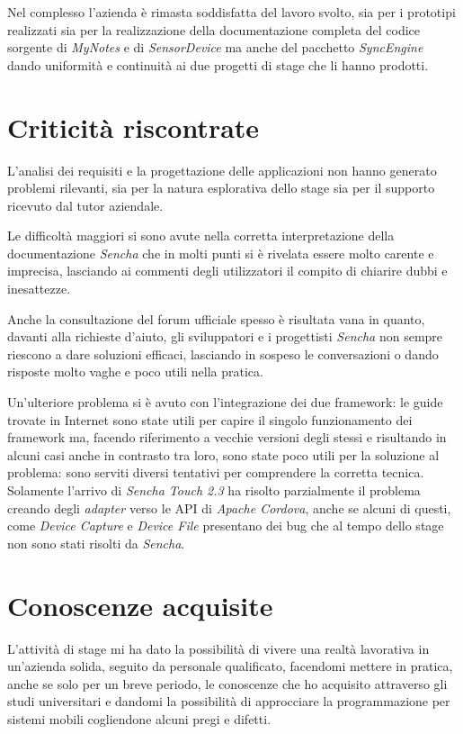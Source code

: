 Nel complesso l'azienda è rimasta soddisfatta del lavoro svolto, sia per i prototipi realizzati sia per la realizzazione della documentazione completa del codice sorgente di \emph{MyNotes} e di \emph{SensorDevice} ma anche del pacchetto \emph{SyncEngine} dando uniformità e continuità ai due progetti di stage che li hanno prodotti.

\section{Criticità riscontrate}
L'analisi dei requisiti e la progettazione delle applicazioni non hanno generato problemi rilevanti, sia per la natura esplorativa dello stage sia per il supporto ricevuto dal tutor aziendale.

Le difficoltà maggiori si sono avute nella corretta interpretazione della documentazione \emph{Sencha} che in molti punti si è rivelata essere molto carente e imprecisa, lasciando ai commenti degli utilizzatori il compito di chiarire dubbi e inesattezze.

Anche la consultazione del forum ufficiale spesso è risultata vana in quanto, davanti alla richieste d'aiuto, gli sviluppatori e i progettisti \emph{Sencha} non sempre riescono a dare soluzioni efficaci, lasciando in sospeso le conversazioni o dando risposte molto vaghe e poco utili nella pratica.

Un'ulteriore problema si è avuto con l'integrazione dei due framework: le guide trovate in Internet sono state utili per capire il singolo funzionamento dei framework ma, facendo riferimento a vecchie versioni degli stessi e risultando in alcuni casi anche in contrasto tra loro, sono state poco utili per la soluzione al problema: sono serviti diversi tentativi per comprendere la corretta tecnica.
Solamente l'arrivo di \emph{Sencha Touch 2.3} ha risolto parzialmente il problema creando degli \emph{adapter} verso le \ac{API} di \emph{Apache Cordova}, anche se alcuni di questi, come \emph{Device Capture} e \emph{Device File} presentano dei bug che al tempo dello stage non sono stati risolti da \emph{Sencha}.

\section{Conoscenze acquisite}
L'attività di stage mi ha dato la possibilità di vivere una realtà lavorativa in un'azienda solida, seguito da personale qualificato, facendomi mettere in pratica, anche se solo per un breve periodo, le conoscenze che ho acquisito attraverso gli studi universitari e dandomi la possibilità di approcciare la programmazione per sistemi mobili cogliendone alcuni pregi e difetti.

